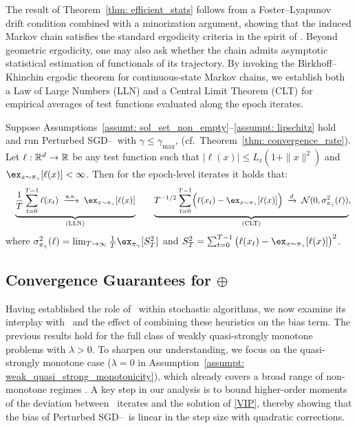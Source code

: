 \vspace{-0.25em}
The result of Theorem~\ref{thm: efficient_stats} follows from a Foster–Lyapunov drift condition combined with a minorization argument, showing that the induced Markov chain satisfies the standard ergodicity criteria in the spirit of \citet{yu2021analysis,vlatakis2024stochastic}.
Beyond geometric ergodicity, one may also ask whether the chain admits asymptotic statistical estimation of functionals of its trajectory. By invoking the Birkhoff--Khinchin ergodic theorem for continuous-state Markov chains, we establish both a Law of Large Numbers (LLN) and a Central Limit Theorem (CLT) for empirical averages of test functions evaluated along the epoch iterates.

\begin{theorem}\label{thm: LLN_CLT_res} 
Suppose Assumptions~\ref{assumt: sol_set_non_empty}--\ref{assumpt: lipschitz} hold and run Perturbed SGD--\RRresh\ with $\gamma \le \gamma_{\max}$, (cf.\ Theorem~\ref{thm: convergence_rate}). Let $\ell:\mathbb{R}^d\to\mathbb{R}$ be any test function such that $|\ell(x)|\le L_\ell(1+\|x\|^2)$ and $\ex_{x\sim\pi_\gamma}[\ell(x)]<\infty$.
Then for the epoch-level iterates it holds that:
\begin{eqnarray}
   &&\underbrace{\frac{1}{T}\sum_{t=0}^{T-1}\ell(x_t) 
  \;\xrightarrow{\text{a.s.}}\; \ex_{x\sim\pi_\gamma}[\ell(x)]}_{\text{(LLN)}}\qquad
 \underbrace{T^{-1/2}\sum_{t=0}^{T-1}\!\Big(\ell(x_t)-\ex_{x\sim\pi_\gamma}[\ell(x)]\Big) 
  \;\xrightarrow{d}\; \mathcal N(0,\sigma^2_{\pi_\gamma}(\ell))}_{\text{(CLT)}},\nonumber
\end{eqnarray}
where $\sigma^2_{\pi_\gamma}(\ell)=\lim_{T\to\infty}\tfrac{1}{T}\ex_{\pi_\gamma}[S_T^2]$ and $S_T^2=\sum_{t=0}^{T-1}\big(\ell(x_t)-\ex_{x\sim\pi_\gamma}[\ell(x)]\big)^2$.
\vspace{-0.25em}
\end{theorem}

\subsection{Convergence Guarantees for \RRrom$\oplus$\RRresh}%
Having established the role of \RRresh\ within stochastic algorithms, we now examine its interplay with \RRrom\ and the effect of combining these heuristics on the bias term.
The previous results hold for the full class of weakly quasi-strongly monotone problems with $\lambda>0$.  
To sharpen our understanding, we focus on the quasi-strongly monotone case ($\lambda=0$ in Assumption~\ref{assumpt: weak_quasi_strong_monotonicity}), which already covers a broad range of non-monotone regimes \citep{loizou2020stochastic}.  
A key step in our analysis is to bound higher-order moments of the deviation between \RRresh\ iterates and the solution of \eqref{VIP}, thereby showing that the bias of Perturbed SGD--\RRresh\ is linear in the step size with quadratic corrections. 


